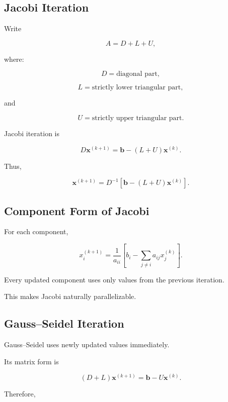 \subsection{Jacobi Iteration}
\label{subsec:jacobi-iteration}

Write

\[
A
=
D+L+U,
\]

where:

\[
D
=
\text{diagonal part},
\]

\[
L
=
\text{strictly lower triangular part},
\]

and

\[
U
=
\text{strictly upper triangular part}.
\]

Jacobi iteration is

\[
\boxed{
D\mathbf{x}^{(k+1)}
=
\mathbf{b}
-
(L+U)
\mathbf{x}^{(k)}.
}
\]

Thus,

\[
\boxed{
\mathbf{x}^{(k+1)}
=
D^{-1}
\left[
\mathbf{b}
-
(L+U)\mathbf{x}^{(k)}
\right].
}
\]

\subsection{Component Form of Jacobi}
\label{subsec:jacobi-component-form}

For each component,

\[
\boxed{
x_i^{(k+1)}
=
\frac1{a_{ii}}
\left[
b_i
-
\sum_{j\neq i}
a_{ij}
x_j^{(k)}
\right].
}
\]

Every updated component uses only values from the previous iteration.

This makes Jacobi naturally parallelizable.

\subsection{Gauss--Seidel Iteration}
\label{subsec:gauss-seidel}

Gauss--Seidel uses newly updated values immediately.

Its matrix form is

\[
\boxed{
(D+L)
\mathbf{x}^{(k+1)}
=
\mathbf{b}
-
U\mathbf{x}^{(k)}.
}
\]

Therefore,

